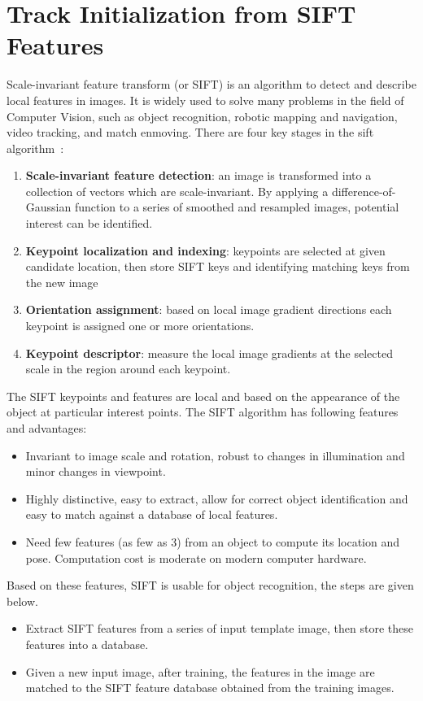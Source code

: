 \section{Track Initialization from SIFT Features}
\label{sec:sift_init}
Scale-invariant feature transform (or SIFT) is an algorithm to detect
and describe local features in images.  It is widely used to solve
many problems in the field of Computer Vision, such as object
recognition, robotic mapping and navigation, video tracking, and match
enmoving. There are four key stages in the sift algorithm~\cite{lowe2004distinctive}:
\begin{enumerate}
\item \textbf{Scale-invariant feature detection}: an image is transformed into
  a collection of vectors which are scale-invariant. By applying a difference-of-Gaussian
function to a series of smoothed and resampled images, potential
interest can be identified.
\item \textbf{Keypoint localization and indexing}: keypoints are selected at given
  candidate location, then store SIFT keys and identifying matching keys from the new image
\item \textbf{Orientation assignment}:  based on local image gradient
  directions each keypoint is assigned one or more orientations.
\item \textbf{Keypoint descriptor}: measure the local image gradients
  at the selected scale in the region around each keypoint.
\end{enumerate}


The SIFT keypoints and features are local and based on the appearance
of the object at particular interest points. The SIFT algorithm has following
features and advantages:
\begin{itemize}
\item Invariant to image scale and rotation, robust to changes in
  illumination and minor changes in viewpoint.
\item Highly distinctive, easy to extract, allow for correct object
  identification and easy to match against a database of local
  features. 
\item Need few features (as few as 3) from an object to compute its location
  and pose. Computation cost is moderate on modern computer hardware.
\end{itemize}

Based on these features, SIFT is usable for object recognition, the
steps are given below.
\begin{itemize}
\item Extract SIFT features from a series of input template image,
  then store these features into a database.
\item Given a new input image, after training, the features in
  the image are matched to the SIFT feature database obtained from the
  training images.
\end{itemize}

